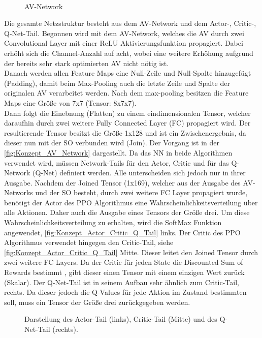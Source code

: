 \begin{wrapfigure}{r}{5.2cm}
	\centering
	
	\caption[AV-Network]{\\AV-Network}
	\label{fig:Konzept_AV_Network}
\end{wrapfigure}

Die gesamte Netzstruktur besteht aus dem AV-Network und dem Actor-, Critic-, Q-Net-Tail.
Begonnen wird mit dem AV-Network, welches die AV durch zwei Convolutional Layer mit einer ReLU Aktivierungsfunktion propagiert. Dabei erhöht sich die Channel-Anzahl auf acht, wobei eine weitere Erhöhung aufgrund der bereits sehr stark optimierten AV nicht nötig ist.\\  
Danach werden allen Feature Maps eine Null-Zeile und Null-Spalte hinzugefügt (Padding), damit beim Max-Pooling auch die letzte Zeile und Spalte der originalen AV verarbeitet werden. Nach dem max-pooling besitzen die Feature Maps eine Größe von 7x7 (Tensor: 8x7x7).\\ 
Dann folgt die Einebnung (Flatten) zu einem eindimensionalen Tensor, welcher daraufhin durch zwei weitere Fully Connected Layer (FC) propagiert wird. Der resultierende Tensor besitzt die Größe 1x128 und ist ein Zwischenergebnis, da dieser nun mit der SO verbunden wird (Join). Der Vorgang ist in der \autoref{fig:Konzept_AV_Network} dargestellt.
Da das NN in beide Algorithmen verwendet wird, müssen Network-Tails für den Actor, Critic und für das Q-Network (Q-Net) definiert werden. Alle unterscheiden sich jedoch nur in ihrer Ausgabe. 
Nachdem der Joined Tensor (1x169), welcher aus der Ausgabe des AV-Networks und der SO besteht, durch zwei weitere FC Layer propagiert wurde, benötigt der Actor des PPO Algorithmus eine Wahrscheinlichkeitsverteilung über alle Aktionen. Daher auch die Ausgabe eines Tensors der Größe drei. Um diese Wahrscheinlichkeitsverteilung zu erhalten, wird die SoftMax Funktion angewendet, \autoref{fig:Konzept_Actor_Critic_Q_Tail} links.
Der Critic des PPO Algorithmus verwendet hingegen den Critic-Tail, siehe \autoref{fig:Konzept_Actor_Critic_Q_Tail} Mitte. Dieser leitet den Joined Tensor durch zwei weitere FC Layers. Da der Critic für jeden State die Discounted Sum of Rewards bestimmt , gibt dieser einen Tensor mit einem einzigen Wert zurück (Skalar).
Der Q-Net-Tail ist in seinem Aufbau sehr ähnlich zum Critic-Tail,  rechts. Da dieser jedoch die Q-Values für jede Aktion im Zustand bestimmten soll, muss ein Tensor der Größe drei zurückgegeben werden.
\begin{figure}[H]
	\centering
	
	\caption[Actor-, Critic- und Q-Net-Tail]{Darstellung des Actor-Tail (links), Critic-Tail (Mitte) und des Q-Net-Tail (rechts).}
	\label{fig:Konzept_Actor_Critic_Q_Tail}
\end{figure}

